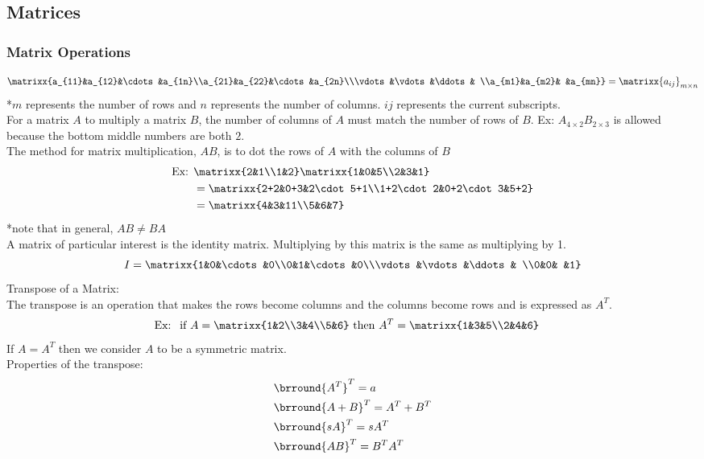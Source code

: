 \subsection{Matrices}
\subsubsection{Matrix Operations}
$$\matrixx{a_{11}&a_{12}&\cdots&a_{1n}\\a_{21}&a_{22}&\cdots&a_{2n}\\\vdots&\vdots&\ddots& \\a_{m1}&a_{m2}& &a_{mn}}=\matrixx{a_{ij}}_{m\times n}$$
*$m$ represents the number of rows and $n$ represents the number of columns. $ij$ represents the current subscripts.\\
For a matrix $A$ to multiply a matrix $B$, the number of columns of $A$ must match the number of rows of $B$. Ex: $A_{4\times2}B_{2\times3}$ is allowed because the bottom middle numbers are both $2$.\\
The method for matrix multiplication, $AB$, is to dot the rows of $A$ with the columns of $B$
\begin{align*}
    \text{Ex: }&\matrixx{2&1\\1&2}\matrixx{1&0&5\\2&3&1}\\
    &=\matrixx{2+2&0+3&2\cdot5+1\\1+2\cdot2&0+2\cdot3&5+2}\\
    &=\matrixx{4&3&11\\5&6&7}
\end{align*}
*note that in general, $AB\neq BA$\\
A matrix of particular interest is the identity matrix. Multiplying by this matrix is the same as multiplying by 1.
$$I=\matrixx{1&0&\cdots&0\\0&1&\cdots&0\\\vdots&\vdots&\ddots& \\0&0& &1}$$
Transpose of a Matrix:\\
The transpose is an operation that makes the rows become columns and the columns become rows and is expressed as $A^T$.
\begin{align*}
    \text{Ex: }&\text{ if }A=\matrixx{1&2\\3&4\\5&6}\text{ then }A^T=\matrixx{1&3&5\\2&4&6}
\end{align*}
If $A=A^T$ then we consider $A$ to be a symmetric matrix.\\
Properties of the transpose:
\begin{align*}
    &\brround{A^T}^T=a\\
    &\brround{A+B}^T=A^T+B^T\\
    &\brround{sA}^T=sA^T\\
    &\brround{AB}^T=B^TA^T
\end{align*}

